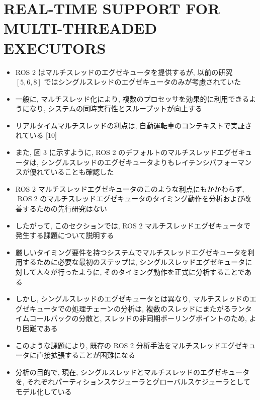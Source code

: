 
\section{REAL-TIME SUPPORT FOR MULTI-THREADED EXECUTORS}
\label{sec: real-time support for multi-threaded executors}

\begin{frame}{}
    \begin{itemize}
        \item ROS 2 はマルチスレッドのエグゼキュータを提供するが, 以前の研究 $[5,6,8]$ ではシングルスレッドのエグゼキュータのみが考慮されていた
        \item 一般に, マルチスレッド化により, 複数のプロセッサを効果的に利用できるようになり, システムの同時実行性とスループットが向上する
        \item リアルタイムマルチスレッドの利点は, 自動運転車のコンテキストで実証されている [10]
        \item また, 図 3 に示すように, ROS 2 のデフォルトのマルチスレッドエグゼキュータは, シングルスレッドのエグゼキュータよりもレイテンシパフォーマンスが優れていることも確認した
        \item ROS 2 マルチスレッドエグゼキュータのこのような利点にもかかわらず,  $\operatorname{ROS} 2$ のマルチスレッドエグゼキュータのタイミング動作を分析および改善するための先行研究はない
        \item したがって, このセクションでは, ROS 2 マルチスレッドエグゼキュータで発生する課題について説明する
    \end{itemize}
\end{frame}

\begin{frame}{}
    \begin{itemize}
        \item 厳しいタイミング要件を持つシステムでマルチスレッドエグゼキュータを利用するために必要な最初のステップは, シングルスレッドエグゼキュータに対して人々が行ったように, そのタイミング動作を正式に分析することである
        \item しかし, シングルスレッドのエグゼキュータとは異なり, マルチスレッドのエグゼキュータでの処理チェーンの分析は, 複数のスレッドにまたがるランタイムコールバックの分散と, スレッドの非同期ポーリングポイントのため, より困難である
        \item このような課題により, 既存の ROS 2 分析手法をマルチスレッドエグゼキュータに直接拡張することが困難になる
        \item 分析の目的で, 現在, シングルスレッドとマルチスレッドのエグゼキュータを, それぞれパーティションスケジューラとグローバルスケジューラとしてモデル化している
    \end{itemize}
\end{frame}

